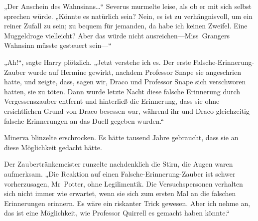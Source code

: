 „Der Anschein des Wahnsinns…“ Severus murmelte leise, als ob er mit sich selbst sprechen würde. „Könnte es natürlich sein? Nein, es ist zu verhängnisvoll, um ein reiner Zufall zu sein; zu bequem für jemanden, da habe ich keinen Zweifel. Eine Muggeldroge vielleicht? Aber das würde nicht ausreichen—Miss~Grangers Wahnsinn müsste gesteuert sein—“

„Ah!“, sagte Harry plötzlich. „Jetzt verstehe ich es. Der erste Falsche-Erinnerung-Zauber wurde auf Hermine gewirkt, nachdem Professor Snape sie angeschrien hatte, und zeigte, dass, sagen wir, Draco und Professor Snape sich verschworen hatten, sie zu töten. Dann wurde letzte Nacht diese falsche Erinnerung durch Vergessenszauber entfernt und hinterließ die Erinnerung, dass sie ohne ersichtlichen Grund von Draco besessen war, während ihr und Draco gleichzeitig falsche Erinnerungen an das Duell gegeben wurden.“

Minerva blinzelte erschrocken. Es hätte tausend Jahre gebraucht, dass sie an diese Möglichkeit gedacht hätte.

Der Zaubertränkemeister runzelte nachdenklich die Stirn, die Augen waren aufmerksam. „Die Reaktion auf einen Falsche-Erinnerung-Zauber ist schwer vorherzusagen, Mr~Potter, ohne Legilimentik. Die Versuchspersonen verhalten sich nicht immer wie erwartet, wenn sie sich zum ersten Mal an die falschen Erinnerungen erinnern. Es wäre ein riskanter Trick gewesen. Aber ich nehme an, das ist eine Möglichkeit, wie Professor Quirrell es gemacht haben könnte.“

